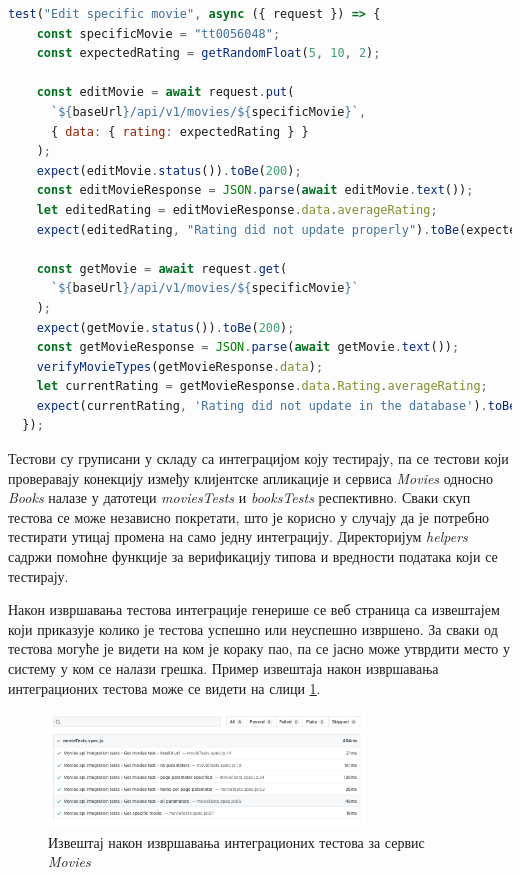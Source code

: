\documentclass[12pt,oneside]{memoir}
\begin{document}
\begin{lstlisting}[caption= Тест интеграције сервиса \textit{Movies} и клијентске апликације, 
language=Javascript,
label={lst:integrationTest},
frame=single]
  test("Edit specific movie", async ({ request }) => {
    const specificMovie = "tt0056048";
    const expectedRating = getRandomFloat(5, 10, 2);

    const editMovie = await request.put(
      `${baseUrl}/api/v1/movies/${specificMovie}`,
      { data: { rating: expectedRating } }
    );
    expect(editMovie.status()).toBe(200);
    const editMovieResponse = JSON.parse(await editMovie.text());
    let editedRating = editMovieResponse.data.averageRating;
    expect(editedRating, "Rating did not update properly").toBe(expectedRating);

    const getMovie = await request.get(
      `${baseUrl}/api/v1/movies/${specificMovie}`
    );
    expect(getMovie.status()).toBe(200);
    const getMovieResponse = JSON.parse(await getMovie.text());
    verifyMovieTypes(getMovieResponse.data);
    let currentRating = getMovieResponse.data.Rating.averageRating;
    expect(currentRating, 'Rating did not update in the database').toBe(expectedRating);
  });
\end{lstlisting}

Тестови су груписани у складу са интеграцијом коју тестирају, па се тестови који проверавају конекцију између клијентске апликације и сервиса \textit{Movies} односно \textit{Books} налазе у датотеци \textit{moviesTests} и \textit{booksTests} респективно. Сваки скуп тестова се може независно покретати, што је корисно у случају да је потребно тестирати утицај промена на само једну интеграцију. Директоријум \textit{helpers} садржи помоћне функције за верификацију типова и вредности података који се тестирају.

Након извршавања тестова интеграције генерише се веб страница са извештајем који приказује колико је тестова успешно или неуспешно извршено. За сваки од тестова могуће је видети на ком је кораку пао, па се јасно може утврдити место у систему у ком се налази грешка. Пример извештаја након извршавања интеграционих тестова може се видети на слици \ref{fig:integrationReport}. 

\begin{figure}[!ht]
  \centering
  \includegraphics[width=0.75\textwidth]{matfmaster/img/integrationReport.png}
  \caption{Извештај након извршавања интеграционих тестова за сервис \textit{Movies}}
  \label{fig:integrationReport}
\end{figure}
\end{document}

